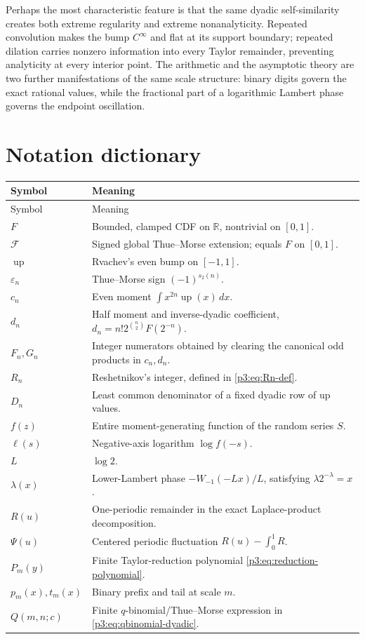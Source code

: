 \documentclass[11pt]{article}
\numberwithin{equation}{section}
\theoremstyle{definition}
\theoremstyle{remark}
\newcommand{\R}{\mathbb R}
\newcommand{\GF}{\mathcal F}
\newcommand{\upf}{\operatorname{up}}
\newcommand{\eps}{\varepsilon}
\begin{document}
Perhaps the most characteristic feature is that the same dyadic self-similarity
creates both extreme regularity and extreme nonanalyticity.  Repeated
convolution makes the bump $C^\infty$ and flat at its support boundary;
repeated dilation carries nonzero information into every Taylor remainder,
preventing analyticity at every interior point.  The arithmetic and the
asymptotic theory are two further manifestations of the same scale structure:
binary digits govern the exact rational values, while the fractional part of
a logarithmic Lambert phase governs the endpoint oscillation.

\appendix

\section{Notation dictionary}\label{p3:app:notation}

\begin{longtable}{p{}p{}}
\toprule
Symbol & Meaning\\
\midrule
\endfirsthead
\toprule
Symbol & Meaning\\
\midrule
\endhead
$F$ & Bounded, clamped CDF on $\R$, nontrivial on $[0,1]$.\\
$\GF$ & Signed global Thue--Morse extension; equals $F$ on $[0,1]$.\\
$\upf$ & Rvachev's even bump on $[-1,1]$.\\
$\eps_n$ & Thue--Morse sign $(-1)^{s_2(n)}$.\\
$c_n$ & Even moment $\int x^{2n}\upf(x)\,dx$.\\
$d_n$ & Half moment and inverse-dyadic coefficient,
$d_n=n!2^{\binom n2}F(2^{-n})$.\\
$F_n,G_n$ & Integer numerators obtained by clearing the canonical odd
products in $c_n,d_n$.\\
$R_n$ & Reshetnikov's integer, defined in \eqref{p3:eq:Rn-def}.\\
$D_n$ & Least common denominator of a fixed dyadic row of up values.\\
$f(z)$ & Entire moment-generating function of the random series $S$.\\
$\ell(s)$ & Negative-axis logarithm $\log f(-s)$.\\
$L$ & $\log2$.\\
$\lambda(x)$ & Lower-Lambert phase
$-W_{-1}(-Lx)/L$, satisfying $\lambda2^{-\lambda}=x$.\\
$R(u)$ & One-periodic remainder in the exact Laplace-product decomposition.\\
$\Psi(u)$ & Centered periodic fluctuation $R(u)-\int_0^1R$.\\
$P_m(y)$ & Finite Taylor-reduction polynomial \eqref{p3:eq:reduction-polynomial}.\\
$p_m(x),t_m(x)$ & Binary prefix and tail at scale $m$.\\
$Q(m,n;c)$ & Finite $q$-binomial/Thue--Morse expression in
\eqref{p3:eq:qbinomial-dyadic}.\\
\bottomrule
\end{longtable}
\end{document}
